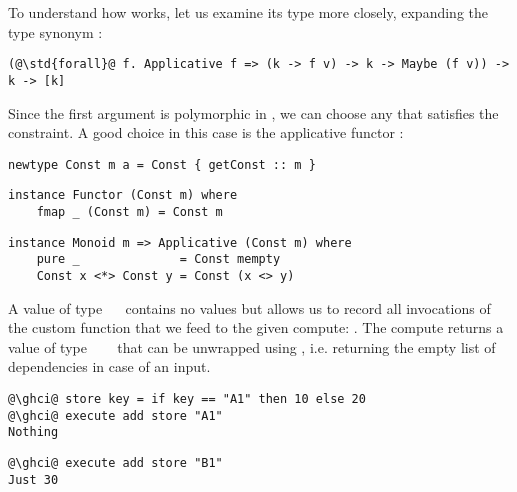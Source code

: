 To understand how  works, let us examine its type more closely,
expanding the type synonym :

\vspace{1mm}
\begin{verbatim}
(@\std{forall}@ f. Applicative f => (k -> f v) -> k -> Maybe (f v)) -> k -> [k]
\end{verbatim}
\vspace{1mm}

\noindent
Since the first argument is polymorphic in , we can choose any  that
satisfies the  constraint. A good choice in this case is the
applicative functor :

\vspace{1mm}
\begin{verbatim}
newtype Const m a = Const { getConst :: m }
\end{verbatim}
\vspace{0.5mm}
\begin{verbatim}
instance Functor (Const m) where
    fmap _ (Const m) = Const m
\end{verbatim}
\vspace{0.5mm}
\begin{verbatim}
instance Monoid m => Applicative (Const m) where
    pure _              = Const mempty
    Const x <*> Const y = Const (x <> y)
\end{verbatim}
\vspace{1mm}

\noindent
A value of type ~\hs{[}\hs{k]}~ contains no values  but
allows us to record all invocations of the custom  function that we
feed to the given compute: . The compute returns a
value of type ~~\hs{[}\hs{k]}~ that can be
unwrapped using , i.e. returning the empty list of
dependencies in case of an input.

\vspace{1mm}
\begin{verbatim}
@\ghci@ store key = if key == "A1" then 10 else 20
@\ghci@ execute add store "A1"
Nothing
\end{verbatim}
\begin{verbatim}
@\ghci@ execute add store "B1"
Just 30
\end{verbatim}

